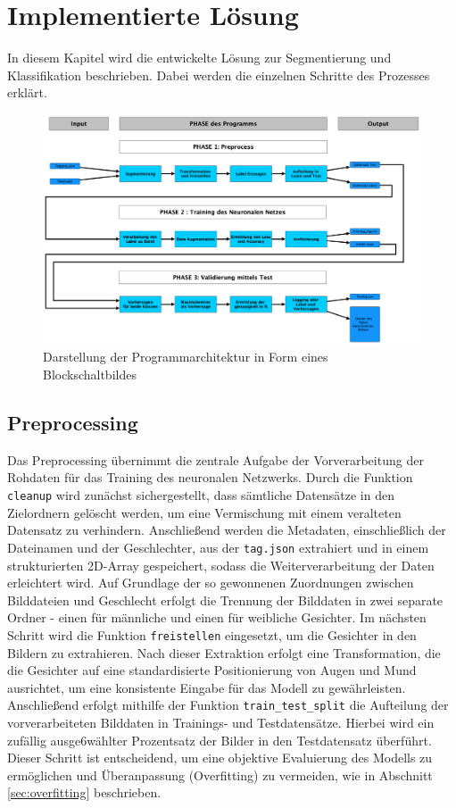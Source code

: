 \documentclass[journal,twoside,web]{ieeecolor}
\begin{document}
\section{Implementierte Lösung}
In diesem Kapitel wird die entwickelte Lösung zur Segmentierung und Klassifikation beschrieben. Dabei werden die einzelnen Schritte des Prozesses erklärt.

\begin{figure}[!t]
    \centerline{\includegraphics[width=\columnwidth]{Architektur.png}}
    \caption{Darstellung der Programmarchitektur in Form eines Blockschaltbildes}
    \label{fig:architecture}
\end{figure}

\subsection{Preprocessing}
Das Preprocessing übernimmt die zentrale Aufgabe der Vorverarbeitung der Rohdaten für das Training des neuronalen Netzwerks.
Durch die Funktion \texttt{cleanup} wird zunächst sichergestellt, dass sämtliche Datensätze in den Zielordnern gelöscht werden, um eine Vermischung mit einem veralteten Datensatz zu verhindern.
Anschließend werden die Metadaten, einschließlich der Dateinamen und der Geschlechter, aus der \texttt{tag.json} extrahiert und in einem strukturierten 2D-Array gespeichert, sodass die Weiterverarbeitung der Daten erleichtert wird.
Auf Grundlage der so gewonnenen Zuordnungen zwischen Bilddateien und Geschlecht erfolgt die Trennung der Bilddaten in zwei separate Ordner - einen für männliche und einen für weibliche Gesichter.
Im nächsten Schritt wird die Funktion \texttt{freistellen} eingesetzt, um die Gesichter in den Bildern zu extrahieren.
Nach dieser Extraktion erfolgt eine Transformation, die die Gesichter auf eine standardisierte Positionierung von Augen und Mund ausrichtet, um eine konsistente Eingabe für das Modell zu gewährleisten.
Anschließend erfolgt mithilfe der Funktion \texttt{train\_test\_split} die Aufteilung der vorverarbeiteten Bilddaten in Trainings- und Testdatensätze.
Hierbei wird ein zufällig ausge6wählter Prozentsatz der Bilder in den Testdatensatz überführt.
Dieser Schritt ist entscheidend, um eine objektive Evaluierung des Modells zu ermöglichen und Überanpassung (Overfitting) zu vermeiden, wie in Abschnitt \ref{sec:overfitting} beschrieben.
\end{document}
